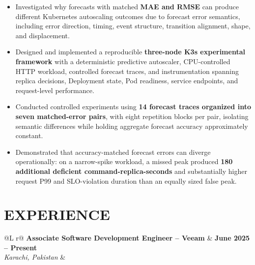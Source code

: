 \documentclass[a4paper,9pt]{article}
\begin{document}
\begin{itemize}
    \item Investigated why forecasts with matched \textbf{MAE and RMSE} can produce different Kubernetes autoscaling outcomes due to forecast error semantics, including error direction, timing, event structure, transition alignment, shape, and displacement.

    \item Designed and implemented a reproducible \textbf{three-node K3s experimental framework} with a deterministic predictive autoscaler, CPU-controlled HTTP workload, controlled forecast traces, and instrumentation spanning replica decisions, Deployment state, Pod readiness, service endpoints, and request-level performance.

    \item Conducted controlled experiments using \textbf{14 forecast traces organized into seven matched-error pairs}, with eight repetition blocks per pair, isolating semantic differences while holding aggregate forecast accuracy approximately constant.

    \item Demonstrated that accuracy-matched forecast errors can diverge operationally: on a narrow-spike workload, a missed peak produced \textbf{180 additional deficient command-replica-seconds} and substantially higher request P99 and SLO-violation duration than an equally sized false peak.
\end{itemize}


\section{EXPERIENCE}

\begin{tabularx}{\linewidth}{@{}L r@{}}
\textbf{Associate Software Development Engineer -- Veeam}
& \textbf{June 2025 -- Present} \\
\textit{Karachi, Pakistan}
&
\end{tabularx}
\end{document}
